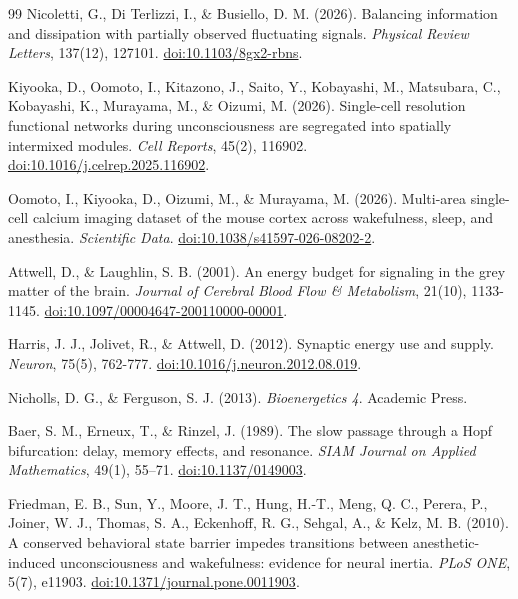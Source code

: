 \begin{thebibliography}{99}
 Nicoletti, G., Di Terlizzi, I., \& Busiello, D. M. (2026). Balancing information and dissipation with partially observed fluctuating signals. \textit{Physical Review Letters}, 137(12), 127101. \href{https://doi.org/10.1103/8gx2-rbns}{doi:10.1103/8gx2-rbns}.

 Kiyooka, D., Oomoto, I., Kitazono, J., Saito, Y., Kobayashi, M., Matsubara, C., Kobayashi, K., Murayama, M., \& Oizumi, M. (2026). Single-cell resolution functional networks during unconsciousness are segregated into spatially intermixed modules. \textit{Cell Reports}, 45(2), 116902. \href{https://doi.org/10.1016/j.celrep.2025.116902}{doi:10.1016/j.celrep.2025.116902}.

 Oomoto, I., Kiyooka, D., Oizumi, M., \& Murayama, M. (2026). Multi-area single-cell calcium imaging dataset of the mouse cortex across wakefulness, sleep, and anesthesia. \textit{Scientific Data}. \href{https://doi.org/10.1038/s41597-026-08202-2}{doi:10.1038/s41597-026-08202-2}.

 Attwell, D., \& Laughlin, S. B. (2001). An energy budget for signaling in the grey matter of the brain. \textit{Journal of Cerebral Blood Flow \& Metabolism}, 21(10), 1133-1145. \href{https://doi.org/10.1097/00004647-200110000-00001}{doi:10.1097/00004647-200110000-00001}.

 Harris, J. J., Jolivet, R., \& Attwell, D. (2012). Synaptic energy use and supply. \textit{Neuron}, 75(5), 762-777. \href{https://doi.org/10.1016/j.neuron.2012.08.019}{doi:10.1016/j.neuron.2012.08.019}.

 Nicholls, D. G., \& Ferguson, S. J. (2013). \textit{Bioenergetics 4}. Academic Press.


 Baer, S. M., Erneux, T., \& Rinzel, J. (1989). The slow passage through a Hopf bifurcation: delay, memory effects, and resonance. \textit{SIAM Journal on Applied Mathematics}, 49(1), 55--71. \href{https://doi.org/10.1137/0149003}{doi:10.1137/0149003}.

 Friedman, E. B., Sun, Y., Moore, J. T., Hung, H.-T., Meng, Q. C., Perera, P., Joiner, W. J., Thomas, S. A., Eckenhoff, R. G., Sehgal, A., \& Kelz, M. B. (2010). A conserved behavioral state barrier impedes transitions between anesthetic-induced unconsciousness and wakefulness: evidence for neural inertia. \textit{PLoS ONE}, 5(7), e11903. \href{https://doi.org/10.1371/journal.pone.0011903}{doi:10.1371/journal.pone.0011903}.


\end{thebibliography}
